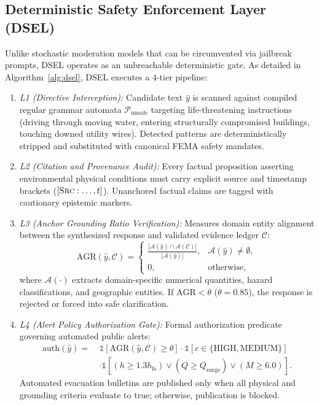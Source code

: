 \documentclass[conference]{IEEEtran}
\begin{document}
\subsection{Deterministic Safety Enforcement Layer (DSEL)}
Unlike stochastic moderation models that can be circumvented via jailbreak prompts, DSEL operates as an unbreachable deterministic gate. As detailed in Algorithm~\ref{alg:dsel}, DSEL executes a 4-tier pipeline:
\begin{enumerate}
    \item \textit{L1 (Directive Interception):} Candidate text $\hat{y}$ is scanned against compiled regular grammar automata $\mathcal{P}_{\mathrm{unsafe}}$ targeting life-threatening instructions (driving through moving water, entering structurally compromised buildings, touching downed utility wires). Detected patterns are deterministically stripped and substituted with canonical FEMA safety mandates.
    \item \textit{L2 (Citation and Provenance Audit):} Every factual proposition asserting environmental physical conditions must carry explicit source and timestamp brackets ($[\textsc{Src}: \dots, t]$). Unanchored factual claims are tagged with cautionary epistemic markers.
    \item \textit{L3 (Anchor Grounding Ratio Verification):} Measures domain entity alignment between the synthesized response and validated evidence ledger $\mathcal{C}$:
    \begin{equation}
    \mathrm{AGR}(\hat{y}, \mathcal{C}) = \begin{cases}
    \frac{|\mathcal{A}(\hat{y}) \cap \mathcal{A}(\mathcal{C})|}{|\mathcal{A}(\hat{y})|}, & \mathcal{A}(\hat{y}) \neq \emptyset,\\
    0, & \text{otherwise},
    \end{cases}
    \label{eq:agr}
    \end{equation}
    where $\mathcal{A}(\cdot)$ extracts domain-specific numerical quantities, hazard classifications, and geographic entities. If $\mathrm{AGR} < \theta$ ($\theta = 0.85$), the response is rejected or forced into safe clarification.
    \item \textit{L4 (Alert Policy Authorization Gate):} Formal authorization predicate governing automated public alerts:
    \begin{equation}
    \begin{aligned}
    \mathrm{auth}(\hat{y}) =~& \mathbb{1}[\mathrm{AGR}(\hat{y}, \mathcal{C}) \ge \theta] \cdot \mathbb{1}[c \in \{\mathrm{HIGH}, \mathrm{MEDIUM}\}] \\
    &\cdot \mathbb{1}[(h \ge 1.3 h_{\mathrm{fs}}) \lor (Q \ge Q_{\mathrm{surge}}) \lor (M \ge 6.0)].
    \end{aligned}
    \label{eq:auth}
    \end{equation}
    Automated evacuation bulletins are published only when all physical and grounding criteria evaluate to true; otherwise, publication is blocked.
\end{enumerate}
\end{document}
